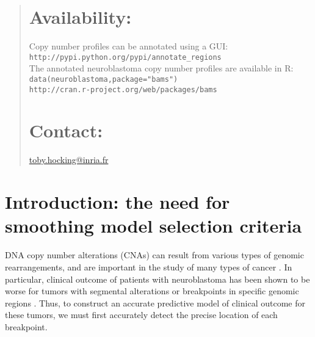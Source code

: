 \documentclass{bioinfo}
\newcommand{\code}[1]{\texttt{#1}}
\begin{document}
\begin{abstract}
\section{Availability:}
Copy number profiles can be annotated using a GUI:\\
\verb+http://pypi.python.org/pypi/annotate_regions+\\
The annotated neuroblastoma copy number profiles
are available in R: \code{data(neuroblastoma,package="bams")}\\
\verb+http://cran.r-project.org/web/packages/bams+

\section{Contact:}
 \href{mailto:toby.hocking@inria.fr}{toby.hocking@inria.fr}
\end{abstract}

\section{Introduction: the need for smoothing model selection
  criteria}

DNA copy number alterations (CNAs) can result from various types of
genomic rearrangements, and are important in the study of many types
of cancer \citep{weinberg}. In particular, clinical outcome of
patients with neuroblastoma has been shown to be worse for tumors with
segmental alterations or breakpoints in specific genomic regions
\citep{isabelle-2009,gudrun-jclinicaloncology}.  Thus, to construct an
accurate predictive model of clinical outcome for these tumors, we
must first accurately detect the precise location of each breakpoint.
\end{document}

